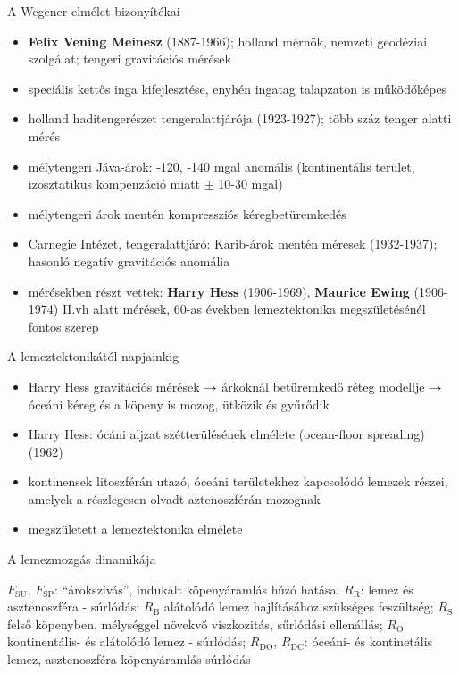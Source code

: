 \documentclass{beamer}
\begin{document}
\begin{frame}{A Wegener elmélet bizonyítékai}
    \begin{itemize}
        \item \textbf{Felix Vening Meinesz} (1887-1966); holland mérnök, nemzeti geodéziai szolgálat; tengeri gravitációs mérések
        \item speciális kettős inga kifejlesztése, enyhén ingatag talapzaton is működőképes
        \item holland haditengerészet tengeralattjárója (1923-1927); több száz tenger alatti mérés
        \item mélytengeri Jáva-árok: -120, -140 mgal anomális (kontinentális terület, izosztatikus kompenzáció miatt $\pm$ 10-30 mgal)
        \item mélytengeri árok mentén kompressziós kéregbetüremkedés
        \item Carnegie Intézet, tengeralattjáró: Karib-árok mentén méresek (1932-1937); hasonló negatív gravitációs anomália
        \item mérésekben részt vettek: \textbf{Harry Hess} (1906-1969), \textbf{Maurice Ewing} (1906-1974) II.vh alatt mérések, 60-as években lemeztektonika megszületésénél fontos szerep
    \end{itemize}
\end{frame}


\begin{frame}{A lemeztektonikától napjainkig}
    \begin{itemize}
        \item Harry Hess gravitációs mérések $\rightarrow$ árkoknál betüremkedő réteg modellje $\rightarrow$ óceáni kéreg és a köpeny is mozog, ütközik és gyűrődik
        \item Harry Hess: ócáni aljzat szétterülésének elmélete (ocean-floor spreading) (1962)
        \item kontinensek litoszférán utazó, óceáni területekhez kapcsolódó lemezek részei, amelyek a részlegesen olvadt aztenoszférán mozognak
        \item megszületett a lemeztektonika elmélete
    \end{itemize}
\end{frame}


\begin{frame}{A lemezmozgás dinamikája}
    \begin{center}
    \begin{minipage}[c]{0.7\textwidth}
        \centering
    \end{minipage}
    \end{center}
    $F_{\text{SU}}$, $F_{\text{SP}}$: ``árokszívás'', indukált köpenyáramlás húzó hatása; $R_{\text{R}}$: lemez és asztenoszféra - súrlódás; $R_{\text{B}}$ alátolódó lemez hajlításához szükséges feszültség; $R_{\text{S}}$ felső köpenyben, mélységgel növekvő viszkozitás, sűrlódási ellenállás; $R_{\text{O}}$ kontinentális- és alátolódó lemez - súrlódás; $R_{\text{DO}}$, $R_{\text{DC}}$: óceáni- és kontinetális lemez, asztenoszféra köpenyáramlás súrlódás
\end{frame}
\end{document}

